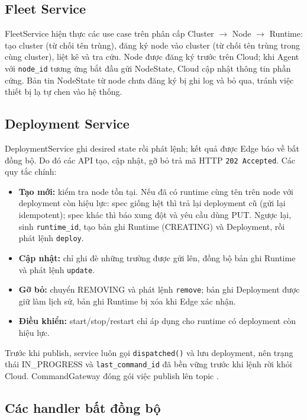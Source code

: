 \subsection{Fleet Service}

FleetService hiện thực các use case trên phân cấp Cluster $\rightarrow$ Node
$\rightarrow$ Runtime: tạo cluster (từ chối tên trùng), đăng ký node vào cluster
(từ chối tên trùng trong cùng cluster), liệt kê và tra cứu. Node được đăng ký
trước trên Cloud; khi Agent với \texttt{node\_id} tương ứng bắt đầu gửi
NodeState, Cloud cập nhật thông tin phần cứng. Bản tin NodeState từ node chưa
đăng ký bị ghi log và bỏ qua, tránh việc thiết bị lạ tự chen vào hệ thống.

\subsection{Deployment Service}

DeploymentService ghi desired state rồi phát lệnh; kết quả được Edge báo về bất
đồng bộ. Do đó các API tạo, cập nhật, gỡ bỏ trả mã HTTP \texttt{202 Accepted}.
Các quy tắc chính:

\begin{itemize}
  \item \textbf{Tạo mới:} kiểm tra node tồn tại. Nếu đã có runtime cùng tên trên
        node với deployment còn hiệu lực: spec giống hệt thì trả lại deployment cũ
        (gửi lại idempotent); spec khác thì báo xung đột và yêu cầu dùng PUT.
        Ngược lại, sinh \texttt{runtime\_id}, tạo bản ghi Runtime (CREATING) và
        Deployment, rồi phát lệnh \texttt{deploy}.
  \item \textbf{Cập nhật:} chỉ ghi đè những trường được gửi lên, đồng bộ bản ghi
        Runtime và phát lệnh \texttt{update}.
  \item \textbf{Gỡ bỏ:} chuyển REMOVING và phát lệnh \texttt{remove}; bản ghi
        Deployment được giữ làm lịch sử, bản ghi Runtime bị xóa khi Edge xác nhận.
  \item \textbf{Điều khiển:} start/stop/restart chỉ áp dụng cho runtime có
        deployment còn hiệu lực.
\end{itemize}

Trước khi publish, service luôn gọi \texttt{dispatched()} và lưu deployment, nên
trạng thái IN\_PROGRESS và \texttt{last\_command\_id} đã bền vững trước khi lệnh
rời khỏi Cloud. CommandGateway đóng gói việc publish lên topic
.

\subsection{Các handler bất đồng bộ}


